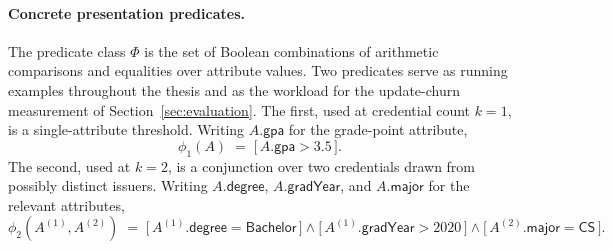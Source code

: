 \begin{construction}
\paragraph{Concrete presentation predicates.}\label{par:phi-examples}
The predicate class $\Phi$ is the set of Boolean combinations of arithmetic comparisons and equalities over attribute values. Two predicates serve as running examples throughout the thesis and as the workload for the update-churn measurement of Section~\ref{sec:evaluation}. The first, used at credential count $k=1$, is a single-attribute threshold. Writing $A.\mathsf{gpa}$ for the grade-point attribute,
\begin{equation*}
  \phi_1(A)\;=\;\bigl[\,A.\mathsf{gpa}>3.5\,\bigr].
\end{equation*}
The second, used at $k=2$, is a conjunction over two credentials drawn from
possibly distinct issuers. Writing $A.\mathsf{degree}$, $A.\mathsf{gradYear}$,
and $A.\mathsf{major}$ for the relevant attributes,
\begin{equation*}
  \phi_2(A^{(1)},A^{(2)})\;=\;
  \bigl[\,A^{(1)}.\mathsf{degree}=\textsf{Bachelor}\,\bigr]
  \wedge
  \bigl[\,A^{(1)}.\mathsf{gradYear}>2020\,\bigr]
  \wedge
  \bigl[\,A^{(2)}.\mathsf{major}=\textsf{CS}\,\bigr].
\end{equation*}

\end{construction}
